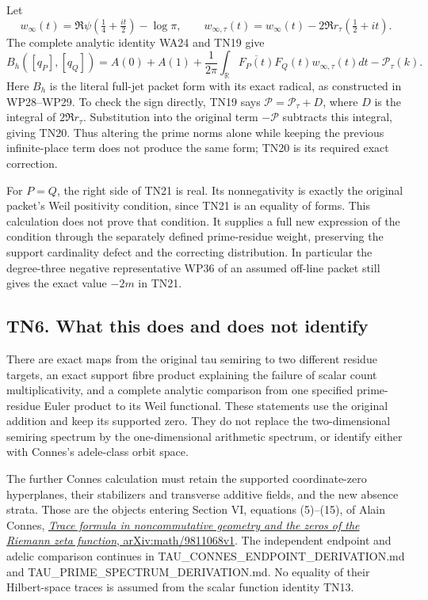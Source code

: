\documentclass[
  10pt,
  a4paper,
]{article}
\begin{document}
Let \[
w_\infty(t)=\Re\psi(\tfrac14+\tfrac{it}2)-\log\pi,
\qquad
w_{\infty,\tau}(t)=w_\infty(t)-2\Re r_\tau(\tfrac12+it).
\tag{TN20}
\] The complete analytic identity WA24 and TN19 give \[
\boxed{B_h([q_P],[q_Q])
=A(0)+A(1)
+\frac1{2\pi}\int_{\mathbb R}\overline{F_P(t)}F_Q(t)
w_{\infty,\tau}(t)dt
-\mathcal P_\tau(k).}
\tag{TN21}
\] Here \(B_h\) is the literal full-jet packet form with its exact
radical, as constructed in WP28--WP29. To check the sign directly, TN19
says \(\mathcal P=\mathcal P_\tau+D\), where \(D\) is the integral of
\(2\Re r_\tau\). Substitution into the original term \(-\mathcal P\)
subtracts this integral, giving TN20. Thus altering the prime norms
alone while keeping the previous infinite-place term does not produce
the same form; TN20 is its required exact correction.

For \(P=Q\), the right side of TN21 is real. Its nonnegativity is
exactly the original packet's Weil positivity condition, since TN21 is
an equality of forms. This calculation does not prove that condition. It
supplies a full new expression of the condition through the separately
defined prime-residue weight, preserving the support cardinality defect
and the correcting distribution. In particular the degree-three negative
representative WP36 of an assumed off-line packet still gives the exact
value \(-2m\) in TN21.

\subsection{TN6. What this does and does not
identify}\label{tn6.-what-this-does-and-does-not-identify}

There are exact maps from the original tau semiring to two different
residue targets, an exact support fibre product explaining the failure
of scalar count multiplicativity, and a complete analytic comparison
from one specified prime-residue Euler product to its Weil functional.
These statements use the original addition and keep its supported zero.
They do not replace the two-dimensional semiring spectrum by the
one-dimensional arithmetic spectrum, or identify either with Connes's
adele-class orbit space.

The further Connes calculation must retain the supported coordinate-zero
hyperplanes, their stabilizers and transverse additive fields, and the
new absence strata. Those are the objects entering Section VI, equations
(5)--(15), of Alain Connes,
\href{https://arxiv.org/abs/math/9811068v1}{\emph{Trace formula in
noncommutative geometry and the zeros of the Riemann zeta function},
arXiv:math/9811068v1}. The independent endpoint and adelic comparison
continues in TAU\_CONNES\_ENDPOINT\_DERIVATION.md and
TAU\_PRIME\_SPECTRUM\_DERIVATION.md. No equality of their Hilbert-space
traces is assumed from the scalar function identity TN13.
\end{document}
